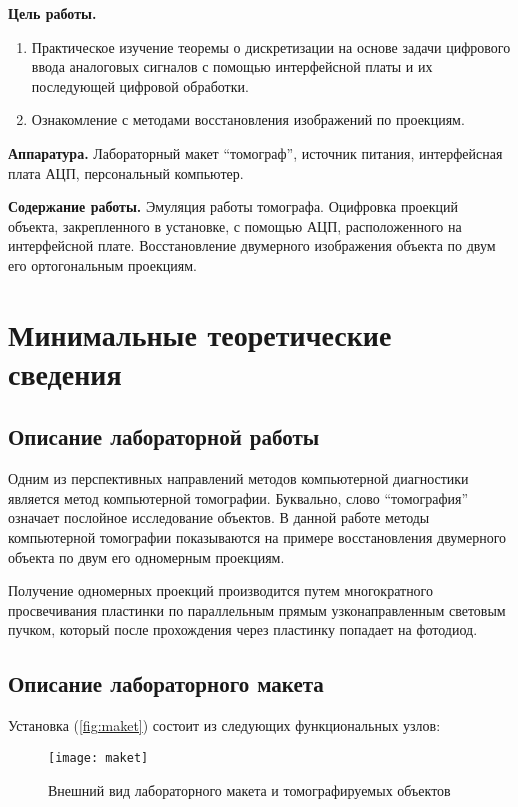 \def \eng #1{\foreignlanguage{english}{#1}}

\textbf{Цель работы.}
%
\begin{enumerate}
	\item Практическое изучение теоремы о дискретизации на основе задачи цифрового ввода аналоговых сигналов с помощью интерфейсной платы и их последующей цифровой обработки.
    \item Ознакомление с методами восстановления изображений по проекциям.
\end{enumerate}

\textbf{Аппаратура.} Лабораторный макет \enquote{томограф}, источник питания, интерфейсная плата АЦП, персональный компьютер.

\textbf{Содержание работы.} Эмуляция работы томографа. Оцифровка проекций объекта, закрепленного в установке, с помощью АЦП, расположенного на интерфейсной плате. Восстановление двумерного изображения объекта по двум его ортогональным проекциям.

\section{Минимальные теоретические сведения}

\subsection{Описание лабораторной работы}

Одним из перспективных направлений методов компьютерной диагностики является метод компьютерной томографии. Буквально, слово \enquote{томография} означает послойное исследование объектов. В данной работе методы компьютерной томографии показываются на примере восстановления двумерного объекта по двум его одномерным проекциям.

Получение одномерных проекций производится путем многократного просвечивания пластинки по параллельным прямым узконаправленным световым пучком, который после прохождения через пластинку попадает на фотодиод.

\subsection{Описание лабораторного макета}

Установка (\autoref{fig:maket}) состоит из следующих функциональных узлов:

\begin{figure}[h]%
    \centering
    \texttt{[image: maket]}%
    \caption[]{Внешний вид лабораторного макета и томографируемых объектов}%
    \label{fig:maket}%
\end{figure}

